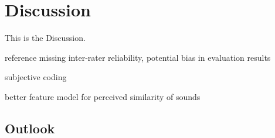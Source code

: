 
\section{Discussion}
\label{sec:discussion}
This is the Discussion.

reference missing inter-rater reliability,
potential bias in evaluation results

subjective coding

better feature model for perceived similarity of sounds

\subsection{Outlook}
\label{subsec:outlook}
